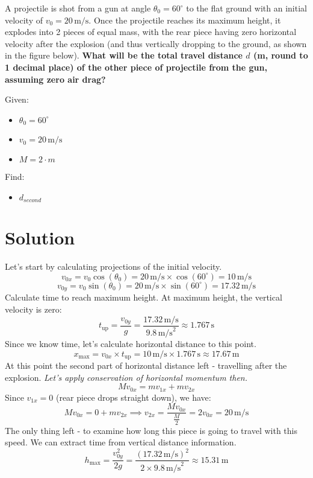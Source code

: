 A projectile is shot from a gun at angle $\theta_0 = 60^\circ$ to the flat ground with an initial velocity of $v_0 = 20 \, \text{m/s}$. Once the projectile reaches its maximum height, it explodes into 2 pieces of equal mass, with the rear piece having zero horizontal velocity after the explosion (and thus vertically dropping to the ground, as shown in the figure below). \textbf{What will be the total travel distance $d$ (m, round to 1 decimal place) of the other piece of projectile from the gun, assuming zero air drag?}

\bigbreak Given:
\begin{itemize}
    \item $\theta_0 = 60^\circ$
    \item $v_0 = 20 \, \text{m/s}$
    \item $M = 2 \cdot m$
\end{itemize}

\bigbreak Find:
\begin{itemize}
    \item $d_{second}$
\end{itemize}

\section*{Solution}
Let's start by calculating projections of the initial velocity.
    \[
    v_{0x} = v_0 \cos(\theta_0) = 20\,\text{m/s} \times \cos(60^\circ) = 10\,\text{m/s}
    \]
    \[
    v_{0y} = v_0 \sin(\theta_0) = 20\,\text{m/s} \times \sin(60^\circ) = 17.32\,\text{m/s}
    \]
Calculate time to reach maximum height. At maximum height, the vertical velocity is zero:
\[
t_{\text{up}} = \frac{v_{0y}}{g} = \frac{17.32\,\text{m/s}}{9.8\,\text{m/s}^2} \approx 1.767\,\text{s}
\]
Since we know time, let's calculate horizontal distance to this point.
\[
x_{\text{max}} = v_{0x} \times t_{\text{up}} = 10\,\text{m/s} \times 1.767\,\text{s} \approx 17.67\,\text{m}
\]
At this point the second part of horizontal distance left - travelling after the explosion.
\textit{Let's apply conservation of horizontal momentum then.}
$$ M v_{0x} = m v_{1x} + m v_{2x} $$
Since \( v_{1x} = 0 \) (rear piece drops straight down), we have:
\[
M v_{0x} = 0 + m v_{2x} \implies v_{2x} = \frac{M v_{0x}}{\frac{M}{2}} = 2 v_{0x} = 20\,\text{m/s}
\]
The only thing left - to examine how long this piece is going to travel with this speed.
We can extract time from vertical distance information.
\[
h_{\text{max}} = \frac{v_{0y}^2}{2g} = \frac{(17.32\,\text{m/s})^2}{2 \times 9.8\,\text{m/s}^2} \approx 15.31\,\text{m}
\]

